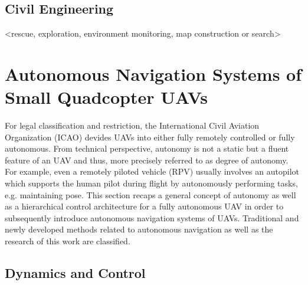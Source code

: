 

\subsection{Civil Engineering}



<rescue,   exploration,  environment  monitoring,  map  construction  or  search>




\section{Autonomous Navigation Systems of Small Quadcopter UAVs}

For legal classification and restriction,
the International Civil Aviation Organization (ICAO)
devides UAVs into either fully remotely controlled 
or fully autonomous.
From technical perspective,
autonomy is not a static
but a fluent feature of an UAV
and thus, more precisely referred to as
degree of autonomy. For example,
even a remotely piloted vehicle (RPV)
usually involves an autopilot
which supports the human pilot
during flight by autonomously
performing tasks, e.g. maintaining pose.
This section recaps a general
concept of autonomy as well as
a hierarchical control architecture for a
fully autonomous UAV in order to
subsequently introduce
autonomous navigation systems of UAVs.
Traditional and newly developed methods
related to autonomous navigation
as well as 
the research of this work are classified.





\subsection{Dynamics and Control}

